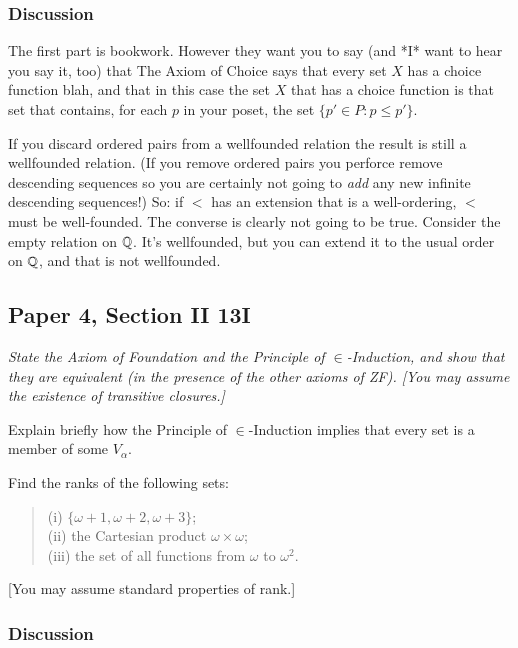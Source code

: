 \documentclass{book}
\begin{document}
\subsubsection*{Discussion}


The first part is bookwork.  However they want you to say (and *I*
want to hear you say it, too) that The Axiom of Choice says that every
set $X$ has a choice function blah, and that in this case the set $X$
that has a choice function is that set that contains, for each $p$ in
your poset, the set $\{p' \in P: p \leq p'\}$.


\smallskip

If you discard ordered pairs from a wellfounded relation the result is
still a wellfounded relation. (If you remove ordered pairs you
perforce remove descending sequences so you are certainly not going to
{\sl add} any new infinite descending sequences!)  So: if $<$ has an
extension that is a well-ordering, $<$ must be well-founded.  The
converse is clearly not going to be true. Consider the empty relation
on $\mathbb{Q}$.  It's wellfounded, but you can extend it to the usual order
on $\mathbb{Q}$, and that is not wellfounded.

\subsection*{Paper 4, Section II 13I}
{\sl State the Axiom of Foundation and the Principle of $\in$-Induction,
and show that they are equivalent (in the presence of the other axioms
of ZF). [You may assume the existence of transitive closures.]

Explain briefly how the Principle of $\in$-Induction implies that
every set is a member of some $V_\alpha$.

Find the ranks of the following sets:
\begin{quote}
(i) $\{\omega+1, \omega+2, \omega+3\}$;\\
(ii) the Cartesian product $\omega \times \omega$;\\
(iii) the set of all functions from $\omega$ to $\omega^2$.
\end{quote}

[You may assume standard properties of rank.]}

\subsubsection*{Discussion}
\end{document}
